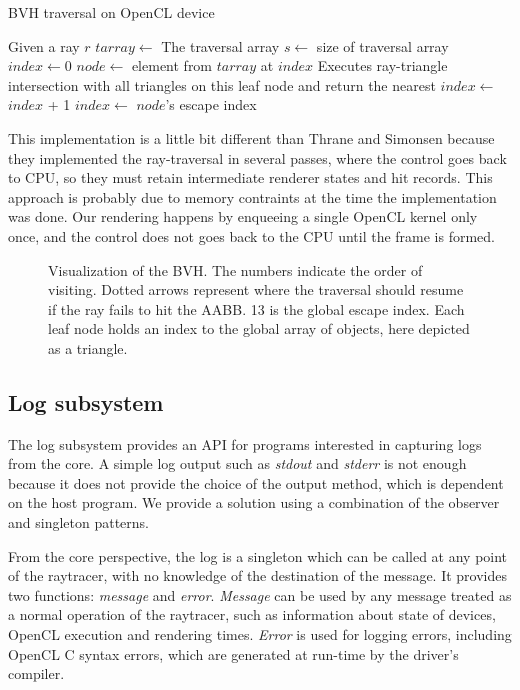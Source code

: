 \documentclass{vgtc}
\begin{document}
\begin{algorithm}
\caption{BVH traversal on OpenCL device}
\label{alg:bvh-traversal}
\begin{algorithmic}[1]
\State Given a ray $r$
\State $tarray\gets$ The traversal array
\State $s\gets$ size of traversal array
\State $index\gets 0$
\State $node\gets$ element from $tarray$ at $index$
\State Executes ray-triangle intersection with all triangles on this leaf node and return the nearest
\Else
\State $index\gets$ $index$ + 1
\EndIf
\Else
\State $index\gets$ $node$'s escape index
\EndIf
\EndWhile
\end{algorithmic}
\end{algorithm}

This implementation is a little bit different than Thrane and Simonsen
because they implemented the ray-traversal in several passes, where
the control goes back to CPU, so they must retain intermediate
renderer states and hit records. This approach is probably due to
memory contraints at the time the implementation was done. Our
rendering happens by enqueeing a single OpenCL kernel only once, and
the control does not goes back to the CPU until the frame is formed.

\begin{figure}
\centering


\caption{Visualization of the BVH. The numbers indicate the order of
  visiting. Dotted arrows represent where the traversal should resume
  if the ray fails to hit the AABB. 13 is the global escape
  index. Each leaf node holds an index to the global array of objects,
  here depicted as a triangle.}
\label{fig:bvh}
\end{figure}


\subsection{Log subsystem}

The log subsystem provides an API for programs interested in capturing
logs from the core. A simple log output such as \emph{stdout} and
\emph{stderr} is not enough because it does not provide the choice of
the output method, which is dependent on the host program. We provide
a solution using a combination of the observer and singleton patterns.

From the core perspective, the log is a singleton which can be called
at any point of the raytracer, with no knowledge of the destination of
the message. It provides two functions: \emph{message} and
\emph{error}. \emph{Message} can be used by any message treated as a normal
operation of the raytracer, such as information about state of
devices, OpenCL execution and rendering times. \emph{Error} is used for
logging errors, including OpenCL C syntax errors, which are generated at
run-time by the driver's compiler.
\end{document}
